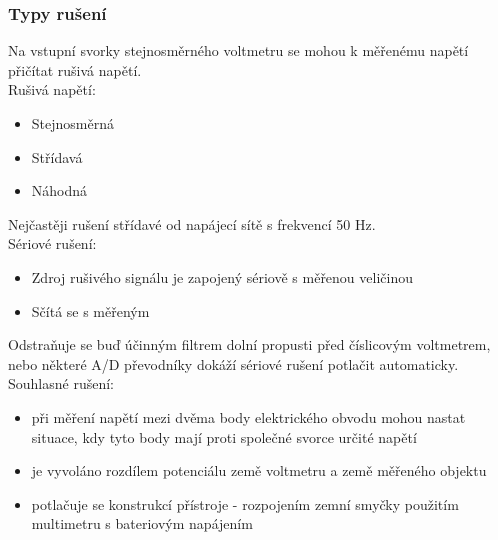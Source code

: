 \subsubsection*{Typy rušení}
Na vstupní svorky stejnosměrného voltmetru se mohou k měřenému napětí přičítat rušivá napětí.\\
Rušivá napětí:
\begin{itemize}
    \item Stejnosměrná
    \item Střídavá
    \item Náhodná
\end{itemize}
Nejčastěji rušení střídavé od napájecí sítě s frekvencí 50 Hz.\\
\newpage
Sériové rušení:
\begin{itemize}
    \item Zdroj rušivého signálu je zapojený sériově s měřenou veličinou
    \item Sčítá se s měřeným
\end{itemize}
Odstraňuje se buď účinným filtrem dolní propusti před číslicovým voltmetrem, nebo některé A/D převodníky dokáží sériové rušení potlačit automaticky.\\
Souhlasné rušení:
\begin{itemize}
    \item při měření napětí mezi dvěma body elektrického obvodu mohou nastat situace, kdy
          tyto body mají proti společné svorce určité napětí
    \item je vyvoláno rozdílem potenciálu země voltmetru a země měřeného objektu
    \item potlačuje se konstrukcí přístroje - rozpojením zemní smyčky použitím multimetru
          s bateriovým napájením
\end{itemize}

